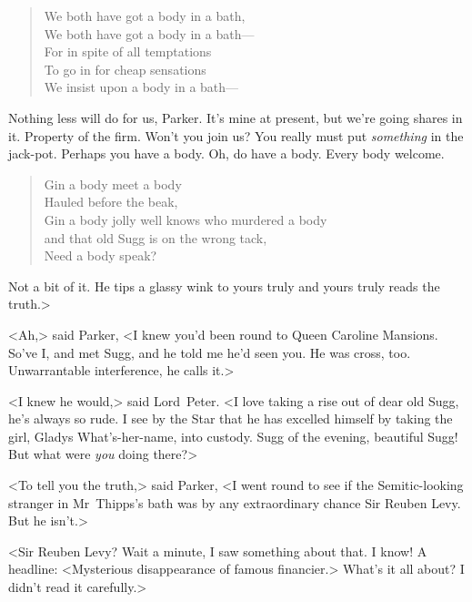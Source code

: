 \begin{verse}
We both have got a body in a bath,\\
We both have got a body in a bath—\\
For in spite of all temptations\\
To go in for cheap sensations\\
We insist upon a body in a bath—\\
\end{verse}

Nothing less will do for us, Parker. It's mine at present, but we're going shares in it. Property of the firm. Won't you join us? You really must put \emph{something} in the jack-pot. Perhaps you have a body. Oh, do have a body. Every body welcome.

\begin{verse}
Gin a body meet a body\\
Hauled before the beak,\\
Gin a body jolly well knows who murdered a body\\
and that old Sugg is on the wrong tack,\\
Need a body speak?
\end{verse}

Not a bit of it. He tips a glassy wink to yours truly and yours truly reads the truth.>

<Ah,> said Parker, <I knew you'd been round to Queen Caroline Mansions. So've I\@, and met Sugg, and he told me he'd seen you. He was cross, too. Unwarrantable interference, he calls it.>

<I knew he would,> said Lord~Peter. <I love taking a rise out of dear old Sugg, he's always so rude. I see by the Star that he has excelled himself by taking the girl, Gladys What's-her-name, into custody. Sugg of the evening, beautiful Sugg! But what were \emph{you} doing there?>

<To tell you the truth,> said Parker, <I went round to see if the Semitic-looking stranger in Mr~Thipps's bath was by any extraordinary chance Sir Reuben Levy. But he isn't.>

<Sir Reuben Levy? Wait a minute, I saw something about that. I know! A headline: <Mysterious disappearance of famous financier.> What's it all about? I didn't read it carefully.>

